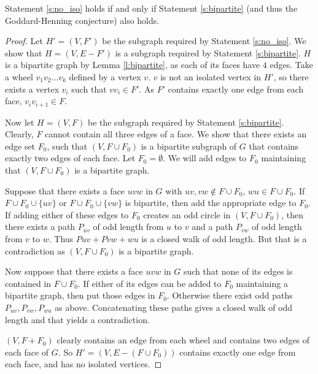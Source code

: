 \begin{claim}
  Statement \ref{s:no_iso} holds if and only if Statement \ref{s:bipartite} (and thus
  the Goddard-Henning conjecture) also holds.
\end{claim}
\begin{proof}
  Let $H' = (V, F')$ be the subgraph required by Statement \ref{s:no_iso}.
  We show that $H = (V, E - F')$ is a subgraph required by Statement \ref{s:bipartite}.
  $H$ is a bipartite graph by Lemma \ref{l:bipartite}, as each of its faces have $4$ edges.
  Take a wheel $v_1v_2\dots v_k$ defined by a vertex $v$. $v$ is not an isolated vertex in $H'$, so
  there exists a vertex $v_i$ such that $vv_i \in F'$. As $F'$ contains exactly one edge
  from each face, $v_iv_{i + 1} \in F$.

  \vspace{0.4cm}

  Now let $H = (V, F)$ be the subgraph required by Statement \ref{s:bipartite}.
  Clearly, $F$ cannot contain all three edges of a face.
  We show that there exists an edge set $F_0$, such that $(V, F \cup F_0)$ is a bipartite
  subgraph of $G$ that contains exactly two edges of each face. Let $F_0 = \emptyset$.
  We will add edges to $F_0$ maintaining that $(V, F \cup F_0)$ is a bipartite graph.

  Suppose that there exists a face $uvw$ in $G$ with $uv, vw \notin F \cup F_0$, $wu \in F \cup F_0$.
  If $F \cup F_0 \cup \{ uv \}$ or $F \cup F_0 \cup \{ vw \}$ is bipartite, then
  add the appropriate edge to $F_0$. If adding either of these edges to $F_0$ creates
  an odd circle in $(V, F \cup F_0)$, then there exists a path $P_{uv}$ of odd
  length from $u$ to $v$ and a path $P_{vw}$ of odd length from $v$ to $w$. Thus $P{uv}
  + P{vw} + wu$ is a closed walk of odd length. But that is a contradiction as
  $(V, F \cup F_0)$ is a bipartite graph.

  Now suppose that there exists a face $uvw$ in $G$ such that none of its edges is
  contained in $F \cup F_0$. If either of its edges can be added to $F_0$ maintaining a
  bipartite graph, then put those edges in $F_0$. Otherwise there exist odd paths
  $P_{uv}, P_{vw}, P_{wu}$ as above. Concatenating these paths gives a closed walk
  of odd length and that yields a contradiction.

  $(V, F + F_0)$ clearly contains an edge from each wheel and contains two
  edges of each face of $G$. So $H' = (V, E - (F \cup F_0))$ contains exactly one edge
  from each face, and has no isolated vertices.
\end{proof}

